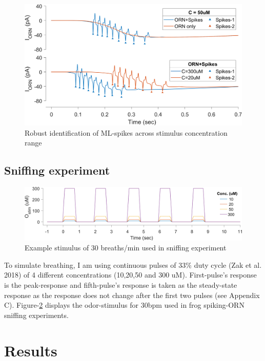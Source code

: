 \documentclass[
]{article}
\begin{document}
\begin{figure}

{\centering \includegraphics[width=0.8\linewidth]{figs/v1/fig_ML_spikes_ID} 

}

\caption{Robust identification of ML-spikes across stimulus concentration range}\label{fig:MLspkID}
\end{figure}

\hypertarget{sniffing-experiment}{%
\subsection{Sniffing experiment}\label{sniffing-experiment}}

\begin{figure}

{\centering \includegraphics[width=0.9\linewidth]{figs/v1/fig_sniff_pulse} 

}

\caption{Example stimulus of 30 breaths/min used in sniffing experiment}\label{fig:pulse}
\end{figure}

To simulate breathing, I am using continuous pulses of 33\% duty cycle (Zak et al. 2018) of 4 different concentrations (10,20,50 and 300 uM). First-pulse's response is the peak-response and fifth-pulse's response is taken as the steady-state response as the response does not change after the first two pulses (see Appendix C). Figure-\ref{fig:pulse} displays the odor-stimulus for 30bpm used in frog spiking-ORN sniffing experiments.

\hypertarget{results}{%
\section{Results}\label{results}}
\end{document}
